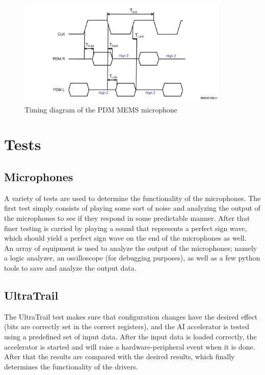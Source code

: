 \begin{figure}[htb]
    \centering
    \includegraphics[width=0.9\textwidth]{figures/pdm_timing.png}
    \caption[Timing diagram of the MP34DT01-M PDM MEMS mic \cite{pdm_mic_datasheet}]{Timing diagram of the PDM MEMS microphone}
    \label{fig:pdm_timing}
\end{figure}

\section{Tests}

\subsection{Microphones}

A variety of tests are used to determine the functionality of the microphones.
The first test simply consists of playing some sort of noise and analyzing the output of the microphones to see if
they respond in some predictable manner.
After that finer testing is carried by playing a sound that represents a perfect sign wave,
which should yield a perfect sign wave on the end of the microphones as well.\\
An array of equipment is used to analyze the output of the microphones; namely a logic analyzer, an oscilloscope
(for debugging purposes), as well as a few python tools to save and analyze the output data.

\subsection{UltraTrail}

The UltraTrail test makes sure that configuration changes have the desired effect (bits are correctly set in the correct registers),
and the AI accelerator is tested using a predefined set of input data.
After the input data is loaded correctly, the accelerator is started and will raise a hardware-peripheral event when it is done.
After that the results are compared with the desired results, which finally determines the functionality of the drivers.
